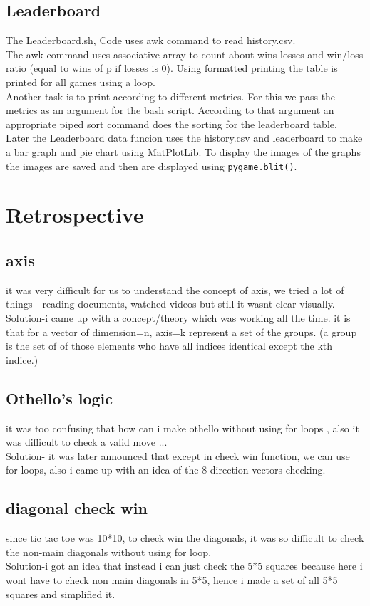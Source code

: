 \documentclass[12pt]{article}
\begin{document}
\subsection{Leaderboard}
The Leaderboard.sh, Code uses awk command to read history.csv.\\ The awk command uses associative array to count about wins losses and win/loss ratio (equal to wins of p if losses is 0). Using formatted printing the table is printed for all games using a loop.\\  Another task is to print according to different metrics. For this we pass the metrics as an argument for the bash script. According to that argument an appropriate piped sort command does the sorting for the leaderboard table.\\
Later the Leaderboard data funcion uses the history.csv and leaderboard to make a bar graph and pie chart using MatPlotLib. To display the images of the graphs the images are saved and then are displayed using \texttt{pygame.blit()}.


\section{Retrospective}
\subsection{axis}
it was very difficult for us to understand the concept of axis, we tried a lot of things - reading documents, watched videos but still it wasnt clear visually.\\

Solution-i came up with a concept/theory which was working all the time.
it is that for a vector of dimension=n, axis=k represent a set of the groups. (a group is the set of of those elements who have all indices identical except the kth indice.)

\subsection{Othello's logic}
it was too confusing that how can i make othello without using for loops , also it was difficult to check a valid move ...
\\
Solution- it was later announced that except in check win function, we can use for loops, also i came up with an idea of the 8 direction vectors checking.

\subsection{diagonal check win}
since tic tac toe was 10*10, to check win the diagonals, it was so difficult to check the non-main diagonals without using for loop.
\\
Solution-i got an idea that instead i can just check the 5*5 squares because here i wont have to check non main diagonals in 5*5, hence i made a set of all 5*5 squares and simplified it.
\end{document}
